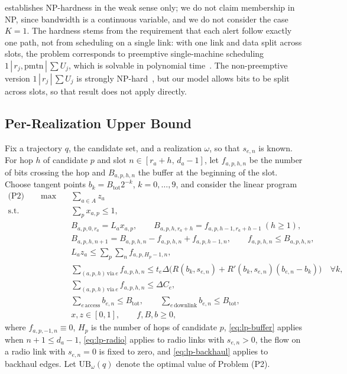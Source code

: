 \begin{remark}
 establishes NP-hardness in the weak sense only; we do not claim membership in NP, since bandwidth is a continuous variable, and we do not consider the case $K=1$. The hardness stems from the requirement that each alert follow exactly one path, not from scheduling on a single link: with one link and data split across slots, the problem corresponds to preemptive single-machine scheduling $1\,|\,r_j,\mathrm{pmtn}\,|\,\sum U_j$, which is solvable in polynomial time~\cite{lawler1990preemptive}. The non-preemptive version $1\,|\,r_j\,|\,\sum U_j$ is strongly NP-hard~\cite{lenstra2020elements}, but our model allows bits to be split across slots, so that result does not apply directly.
\end{remark}

\subsection{Per-Realization Upper Bound}
\label{sec:bound}

Fix a trajectory $q$, the candidate set, and a realization $\omega$, so that $s_{e,n}$ is known. For hop $h$ of candidate $p$ and slot $n\in[r_a+h,\,d_a-1]$, let $f_{a,p,h,n}$ be the number of bits crossing the hop and $B_{a,p,h,n}$ the buffer at the beginning of the slot. Choose tangent points $b_k=B_{\mathrm{tot}}2^{-k}$, $k=0,\dots,9$, and consider the linear program
\begin{subequations}
\label{eq:lp}
\begin{align}
\text{(P2)}\qquad \max\quad & \textstyle\sum_{a\in A} z_a \label{eq:lp-objective}\\
\text{s.t.}\quad
& \textstyle\sum_{p} x_{a,p}\le 1, \label{eq:lp-choice}\\
& B_{a,p,0,r_a}=L_a x_{a,p},\qquad B_{a,p,h,r_a+h}=f_{a,p,h-1,r_a+h-1}\ (h\ge 1), \label{eq:lp-init}\\
& B_{a,p,h,n+1}=B_{a,p,h,n}-f_{a,p,h,n}+f_{a,p,h-1,n},\qquad f_{a,p,h,n}\le B_{a,p,h,n}, \label{eq:lp-buffer}\\
& L_a z_a\le \textstyle\sum_{p}\sum_{n} f_{a,p,H_p-1,n}, \label{eq:lp-deadline}\\
& \textstyle\sum_{(a,p,h)\,\text{via}\,e} f_{a,p,h,n}\le t_e\Delta\bigl(R(b_k,s_{e,n})+R'(b_k,s_{e,n})(b_{e,n}-b_k)\bigr)\quad \forall k, \label{eq:lp-radio}\\
& \textstyle\sum_{(a,p,h)\,\text{via}\,e} f_{a,p,h,n}\le \Delta C_e, \label{eq:lp-backhaul}\\
& \textstyle\sum_{e\,\text{access}} b_{e,n}\le B_{\mathrm{tot}},\qquad \sum_{e\,\text{downlink}} b_{e,n}\le B_{\mathrm{tot}}, \label{eq:lp-spectrum}\\
& x,z\in[0,1],\qquad f,B,b\ge 0, \label{eq:lp-domain}
\end{align}
\end{subequations}
where $f_{a,p,-1,n}\equiv 0$, $H_p$ is the number of hops of candidate $p$, \eqref{eq:lp-buffer} applies when $n+1\le d_a-1$, \eqref{eq:lp-radio} applies to radio links with $s_{e,n}>0$, the flow on a radio link with $s_{e,n}=0$ is fixed to zero, and \eqref{eq:lp-backhaul} applies to backhaul edges. Let $\mathrm{UB}_\omega(q)$ denote the optimal value of Problem (P2).


